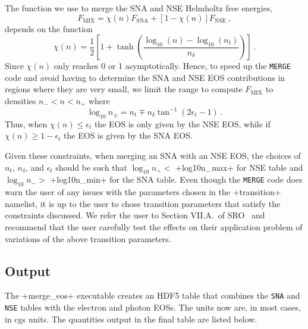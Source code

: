 \documentclass[letterpaper,11pt]{refart}
\begin{document}
The function we use to merge the SNA and NSE Helmholtz free energies,
\begin{equation}
F_{\textrm{MIX}}=\chi(n) F_{\textrm{SNA}} + [1-\chi(n)] F_{\textrm{NSE}}\,,
\end{equation}
depends on the function
\begin{equation}
 \chi(n) = \frac{1}{2}\left[1+\tanh\left(\frac{\log_{10}(n)-\log_{10}(n_t)}{n_\delta}\right)\right]\,.
\end{equation}
Since $\chi(n)$ only reaches 0 or 1 asymptotically.
Hence, to speed up the \verb+MERGE+ code and avoid having to determine 
the SNA and NSE EOS contributions in regions where they are very small, 
we limit the range to compute $F_{\textrm{MIX}}$ to densities $n_-<n<n_+$
where 
\begin{equation}
 \log_{10}n_\pm = n_t \mp n_\delta \tan^{-1}\left(2\epsilon_t-1\right)\,.
\end{equation}
Thus, when $\chi(n)\leq\epsilon_t$ the EOS is only given by the NSE EOS, 
while if $\chi(n)\geq1-\epsilon_t$ the EOS is given by the SNA EOS. 


Given these constraints, when merging an SNA with an NSE EOS, the
choices of $n_t$, $n_\delta$, and $\epsilon_t$ should be such that
$\log_{10}n_+<$
\verbprm+log10n_max+ for NSE table and $\log_{10}n_->$ \verbprm+log10n_min+
for the SNA table.  Even though the \verb+MERGE+ code does warn the
user of any issues with the parameters chosen in the
\verbnml+transition+ namelist, it is up to the user to chose
transition parameters that satisfy the constraints discussed.  We
refer the user to Section VII.A.\ of SRO~\cite{schneider:17} and
recommend that the user carefully test the effects on their
application problem of variations of the above transition parameters.



\subsection{Output}
\label{ssec:MERGE_out}

The \verbexec+merge_eos+ executable creates an HDF5 table that
combines the \verb+SNA+ and \verb+NSE+ tables with the electron and
photon EOSs. The units now are, in most cases, in cgs units. The
quantities output in the final table are listed below.
\end{document}
